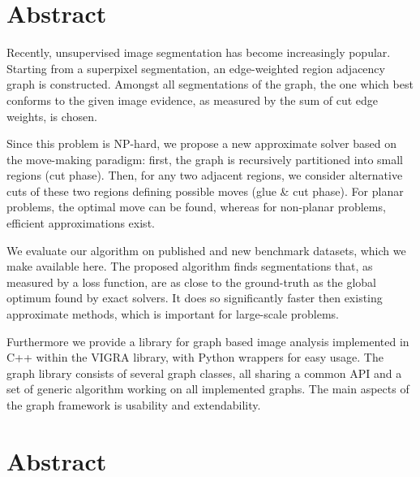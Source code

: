 
\begingroup
\let\clearpage\relax
\let\cleardoublepage\relax
\let\cleardoublepage\relax

\chapter*{Abstract} %

Recently, unsupervised image segmentation has become increasingly
popular.
Starting from a superpixel segmentation, an edge-weighted region
adjacency graph is constructed. Amongst all
segmentations of the graph,
the one which best conforms to the given image
evidence, as measured by the sum of cut edge weights,
is chosen.

Since this problem is NP-hard, we propose 
a new approximate solver based on the move-making paradigm:
first, the graph is recursively partitioned into
small regions (cut phase).
%
Then, for any two adjacent 
regions, we consider alternative cuts of these two regions
defining possible moves (glue \& cut phase).
%
For planar problems, the optimal move can be found, whereas
for non-planar problems, efficient approximations exist. 

We evaluate our algorithm on published and
new benchmark datasets, which we make available here.
%
The proposed algorithm finds segmentations that,
as measured by a loss function, are as close to
the ground-truth as the global optimum found by exact solvers.
%
It does so significantly faster then existing approximate methods,
which is important for large-scale problems.

Furthermore we provide a library for graph based image analysis implemented
in C++ within the  VIGRA library, with Python wrappers
for easy usage.
The graph library consists of several graph classes, all 
sharing a common API and a set of generic algorithm working
on all implemented graphs.
The main aspects of the graph framework is usability and extendability.


\endgroup			

\vfill



\cleardoublepage
\begingroup
\let\clearpage\relax
\let\cleardoublepage\relax
\let\cleardoublepage\relax


\chapter*{Abstract} %

